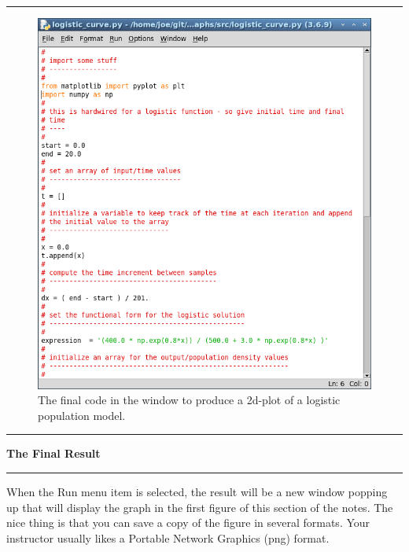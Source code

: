 \documentclass[10pt,fleqn]{article}
\begin{document}
\vskip0.1in\hrule\vskip0.1in
\vfill
\begin{figure}[h]
\centering
\includegraphics[width=6.0in]{../images/2dplot_05.png}
\caption{The final code in the window to produce a 2d-plot of a logistic
         population model.}
\end{figure}
\eject
\vskip0.1in\hrule\vskip0.1in\noindent
{\bf The Final Result} 
\vskip0.1in\hrule\vskip0.1in\noindent
When the Run menu item is selected, the result will be a new window popping up
that will display the graph in the first figure of this section of the notes.
The nice thing is that you can save a copy of the figure in several formats.
Your instructor usually likes a Portable Network Graphics (png) format.
\end{document}
